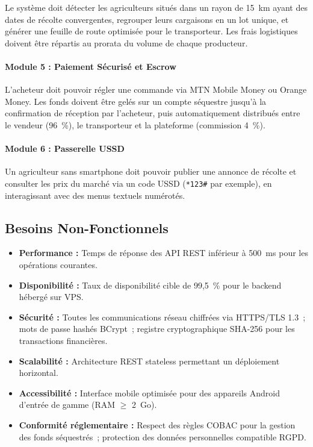 \documentclass[12pt,a4paper]{report}
\begin{document}
Le système doit détecter les agriculteurs situés dans un rayon de 15~km ayant des dates de récolte convergentes, regrouper leurs cargaisons en un lot unique, et générer une feuille de route optimisée pour le transporteur. Les frais logistiques doivent être répartis au prorata du volume de chaque producteur.

\paragraph{Module 5 : Paiement Sécurisé et Escrow}

L'acheteur doit pouvoir régler une commande via MTN Mobile Money ou Orange Money. Les fonds doivent être gelés sur un compte séquestre jusqu'à la confirmation de réception par l'acheteur, puis automatiquement distribués entre le vendeur (96~\%), le transporteur et la plateforme (commission 4~\%).

\paragraph{Module 6 : Passerelle USSD}

Un agriculteur sans smartphone doit pouvoir publier une annonce de récolte et consulter les prix du marché via un code USSD (\texttt{*123\#} par exemple), en interagissant avec des menus textuels numérotés.

\subsection{Besoins Non-Fonctionnels}

\begin{itemize}
  \item \textbf{Performance :} Temps de réponse des API REST inférieur à 500~ms pour les opérations courantes.
  \item \textbf{Disponibilité :} Taux de disponibilité cible de 99,5~\% pour le backend hébergé sur VPS.
  \item \textbf{Sécurité :} Toutes les communications réseau chiffrées via HTTPS/TLS 1.3~; mots de passe hashés BCrypt~; registre cryptographique SHA-256 pour les transactions financières.
  \item \textbf{Scalabilité :} Architecture REST stateless permettant un déploiement horizontal.
  \item \textbf{Accessibilité :} Interface mobile optimisée pour des appareils Android d'entrée de gamme (RAM $\geq$ 2~Go).
  \item \textbf{Conformité réglementaire :} Respect des règles COBAC pour la gestion des fonds séquestrés~; protection des données personnelles compatible RGPD.
\end{itemize}
\end{document}
